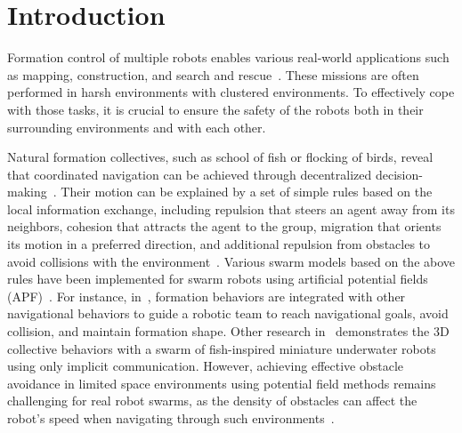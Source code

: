 \section{Introduction}

Formation control of multiple robots enables various real-world applications such as mapping, construction, and search and rescue~\cite{9306908,Oh2015}. These missions are often performed in harsh environments with clustered environments. To effectively cope with those tasks, it is crucial to ensure the safety of the robots both in their surrounding environments and with each other.

Natural formation collectives, such as school of fish or flocking of birds, reveal that coordinated navigation can be achieved through decentralized decision-making~\cite {Nagy2010}. Their motion can be explained by a set of simple rules based on the local information exchange, including repulsion that steers an agent away from its neighbors, cohesion that attracts the agent to the group, migration that orients its motion in a preferred direction, and additional repulsion from obstacles to avoid collisions with the environment~\cite{Reynolds1987}. Various swarm models based on the above rules have been implemented for swarm robots using artificial potential fields (APF)~\cite{736776,Berlinger2021,9565893}. For instance, in~\cite{736776}, formation behaviors are integrated with other navigational behaviors to guide a robotic team to reach navigational goals, avoid collision, and maintain formation shape. Other research in~\cite{Berlinger2021} demonstrates the 3D collective behaviors with a swarm of fish-inspired miniature underwater robots using only implicit communication. However, achieving effective obstacle avoidance in limited space environments using potential field methods remains challenging for real robot swarms, as the density of obstacles can affect the robot's speed when navigating through such environments~\cite{131810}.

